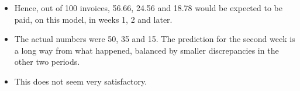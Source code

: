\documentclass[a4paper,12pt]{article}
\begin{document}
\begin{enumerate}
\begin{itemize}
\item Hence, out
of 100 invoices, 56.66, 24.56 and 18.78 would be expected to be paid, on this model,
in weeks 1, 2 and later. 
\item The actual numbers were 50, 35 and 15. The prediction for
the second week is a long way from what happened, balanced by smaller
discrepancies in the other two periods. 
\item This does not seem very satisfactory.
\end{itemize}
\end{enumerate}
\end{document}
